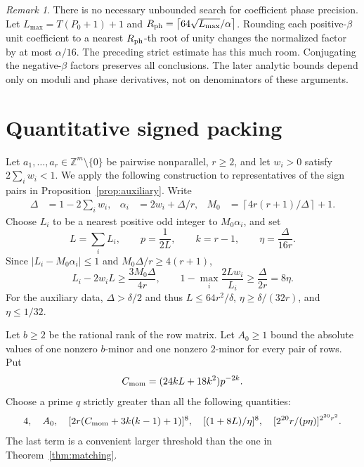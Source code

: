 \documentclass[11pt]{article}
\theoremstyle{remark}
\newtheorem{remark}[theorem]{Remark}
\newcommand{\Z}{\mathbb Z}
\newcommand{\ceil}[1]{\left\lceil #1\right\rceil}
\begin{document}
\begin{remark}
There is no necessary unbounded search for coefficient phase precision.
Let $L_{\max}=T(P_0+1)+1$ and
$R_{\rm ph}=\ceil{64\sqrt{L_{\max}}/\alpha}$.
Rounding each positive-$\beta$ unit coefficient to a nearest
$R_{\rm ph}$-th root of unity changes the normalized factor by at most
$\alpha/16$. The preceding strict estimate has this much room.
Conjugating the negative-$\beta$ factors preserves all conclusions.
The later analytic bounds depend only on moduli and phase derivatives,
not on denominators of these arguments.
\end{remark}

\section{Quantitative signed packing}\label{sec:packing}

Let $a_1,\ldots,a_r\in\Z^m\setminus\{0\}$ be pairwise nonparallel,
$r\ge2$, and let $w_i>0$ satisfy $2\sum_iw_i<1$. We apply the following
construction to representatives of the sign pairs in
Proposition~\ref{prop:auxiliary}. Write
\begin{align*}
 \Delta&=1-2\sum_iw_i,&
 \alpha_i&=2w_i+\Delta/r,&
 M_0&=\ceil{4r(r+1)/\Delta}+1.
\end{align*}
Choose $L_i$ to be a nearest positive odd integer to $M_0\alpha_i$, and set
\[
 L=\sum_iL_i,\qquad p=\frac1{2L},\qquad
 k=r-1,\qquad \eta=\frac{\Delta}{16r}.
\]
Since $|L_i-M_0\alpha_i|\le1$ and $M_0\Delta/r\ge4(r+1)$,
\begin{equation}\label{eq:slot-slack}
 L_i-2w_iL\ge\frac{3M_0\Delta}{4r},\qquad
 1-\max_i\frac{2Lw_i}{L_i}\ge\frac{\Delta}{2r}=8\eta.
\end{equation}
For the auxiliary data, $\Delta>\delta/2$ and thus
$L\le64r^2/\delta$, $\eta\ge\delta/(32r)$, and $\eta\le1/32$.

Let $b\ge2$ be the rational rank of the row matrix. Let $A_0\ge1$ bound
the absolute values of one nonzero $b$-minor and one nonzero $2$-minor for
every pair of rows. Put
\[
 C_{\rm mom}=(24kL+18k^2)p^{-2k}.
\]
Choose a prime $q$ strictly greater than all the following quantities:
\begin{equation}\label{eq:packing-threshold}
 \begin{gathered}
 4,\quad A_0,\quad
 [2r(C_{\rm mom}+3k(k-1)+1)]^8,\quad
 [(1+8L)/\eta]^8,\quad
 [2^{20}r/(p\eta)]^{2^{20}r^2}.
 \end{gathered}
\end{equation}
The last term is a convenient larger threshold than the one in
Theorem~\ref{thm:matching}.
\end{document}
